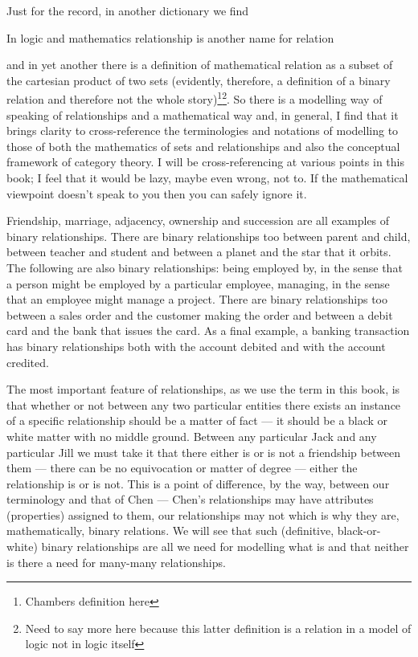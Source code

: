 \mynote
Just for the record, in another dictionary we find 
\begin{erquote}
In logic and mathematics relationship is another name for relation
\end{erquote}
and in yet another there is a definition of mathematical relation as a subset of the cartesian product of two sets 
(evidently, therefore, a definition of a binary relation and therefore not the whole story)\footnote{Chambers definition here}\footnote{Need to say more here because this latter definition is a relation in a model of logic not in logic itself}. 
\mynote
So there is a modelling way of speaking of relationships and a mathematical way and, in general,
I find that it brings clarity to cross-reference the terminologies and notations of modelling to those of 
both the mathematics of sets and relationships and also the conceptual framework of category theory. I will be cross-referencing at various points in this book; I feel that it would be lazy, maybe even wrong, not to. If the mathematical viewpoint doesn't speak to you then you can safely ignore it. 

\mynote
Friendship,  marriage, adjacency, ownership and succession are all examples of binary relationships. There are binary relationships too  between parent and child, between teacher and student and between a planet and the star that it orbits.   
The following are also binary relationships:
being employed by, in the sense that a person might be employed by a particular employee,
managing, in the sense that an employee might manage a project. 
There are binary relationships too between a sales order and the customer making the order and between a debit card and  the bank that issues the card. As a final example, a banking transaction has binary relationships both with the account debited and with the account credited. 

\mynote The most important feature of relationships, as we use the term in this book, is that
whether or not  between any two particular entities there exists an instance of a specific relationship
should be a matter of fact --- it should be a  black or white matter with no middle ground. 
Between any particular Jack and any particular Jill we must take it that there either is or is not a friendship between them --- there can be no equivocation or matter of degree --- either the relationship is or is not. This is a point of difference, by the way, between our terminology and that of Chen --- Chen's relationships may have attributes (properties) assigned to them, our relationships may not which is why they are, mathematically, binary relations. 
We will see that such (definitive, black-or-white) binary relationships are all we need for modelling what is and that neither is there a need for many-many relationships. 

